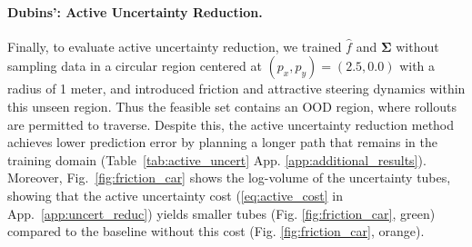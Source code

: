 \documentclass{l4dc2026}
\newcommand{\covariance}{\mathbf{\Sigma}}
\begin{document}
\paragraph{Dubins': Active Uncertainty Reduction.}
Finally, to evaluate active uncertainty reduction, we trained $\hat{f}$ and $\covariance$ without sampling data in a circular region centered at $(p_x, p_y) = (2.5, 0.0)$ with a radius of 1 meter, and introduced friction and attractive steering dynamics within this unseen region. Thus the feasible set contains an OOD region, where rollouts are permitted to traverse. Despite this, the active uncertainty reduction method achieves lower prediction error by planning a longer path that remains in the training domain (Table~\ref{tab:active_uncert} App. \ref{app:additional_results}). Moreover, Fig.~\ref{fig:friction_car} shows the log-volume of the uncertainty tubes, showing that the active uncertainty cost (\eqref{eq:active_cost} in App.~\ref{app:uncert_reduc}) yields smaller tubes (Fig. \ref{fig:friction_car}, green) compared to the baseline without this cost (Fig. \ref{fig:friction_car}, orange).
\end{document}
